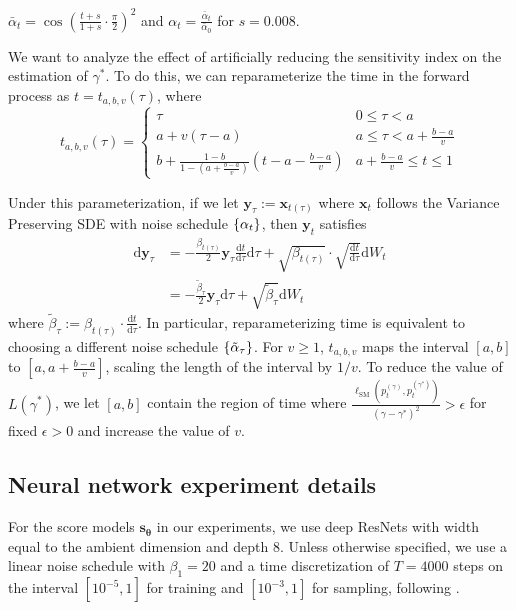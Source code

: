 \documentclass[11pt]{article}
\newcommand{\fitparenth}[1]{\left(#1\right)}
\newcommand{\fitbracket}[1]{\left[#1\right]}
\newcommand{\vect}[1]{\mathbf{#1}}
\theoremstyle{plain}
\newcommand{\1}{\mathbbm{1}}
\DeclarePairedDelimiter{\set}{\lbrace}{\rbrace}
\newcommand{\btheta}{{\boldsymbol{\theta}}}
\newcommand{\vx}{\vect{x}}
\newcommand{\vs}{\vect{s}}
\newcommand{\lsm}{\ell_\mathrm{SM}}
\newcommand{\pdist}[2][]{p_{#1}^{(#2)}}
\begin{document}
\begin{appendices}
$    \bar\alpha_t=\cos\fitparenth{\frac{t+s}{1+s}\cdot \frac{\pi}{2}}^2$ and $\alpha_t =\frac{\bar\alpha_t}{\bar\alpha_0}$
for $s=0.008$. 


We want to analyze the effect of artificially reducing the sensitivity index on the estimation of $\gamma^*$. To do this, we can reparameterize the time in the forward process as $t=t_{a,b,v}(\tau)$, where 
\[t_{a,b,v}(\tau)=\begin{cases}
    \tau & 0\leq \tau<a
    \\
    a + v(\tau-a)& a \leq \tau <a + \frac{b-a}{v}
    \\
    b + \frac{1-b}{1-\fitparenth{a + \frac{b-a}{v}}}\fitparenth{t - a - \frac{b-a}{v}} & a + \frac{b-a}{v} \leq t\leq 1
\end{cases}\]

Under this parameterization, if we let $\vect y_\tau:= \vx_{t(\tau)}$ where $\vx_t$ follows the Variance Preserving SDE with noise schedule $\set{\alpha_t}$, then $\vect y_t$ satisfies
\begin{align}
    \mathrm{d}\vect y_\tau &= -\frac{\beta_{t(\tau)}}{2}\vect y_\tau \frac{\mathrm{d}t}{\mathrm{d} \tau}\mathrm{d}\tau + \sqrt{\beta_{t(\tau)}}\cdot \sqrt{\frac{\mathrm{d}t}{\mathrm{d}\tau}}\mathrm dW_t
    \\
    &= -\frac{\tilde{\beta}_{\tau}}{2}\vect y_\tau \mathrm{d}\tau + \sqrt{\tilde{\beta}_{\tau}}\mathrm{d}W_t
\end{align}
where $\tilde{\beta}_\tau:= \beta_{t(\tau)} \cdot \frac{\mathrm{d}t}{\mathrm{d}\tau}$. In particular, reparameterizing time is equivalent to choosing a different noise schedule $\set{\tilde{\alpha}_\tau}$. For $v\geq 1$, $t_{a,b,v}$ maps the interval $[a,b]$ to $\fitbracket{a, a+\frac{b-a}{v}}$, scaling the length of the interval by $1/v$. To reduce the value of $L(\gamma^*)$, we let $[a,b]$ contain the region of time where $\frac{\lsm(\pdist[t]{\gamma}, \pdist[t]{\gamma^*})}{(\gamma-\gamma^*)^2}>\epsilon$ for fixed $\epsilon>0$ and increase the value of $v$.

\subsection{Neural network experiment details}

For the score models $\vs_\btheta$ in our experiments, we use deep ResNets \citep{He2015DeepRL} with width equal to the ambient dimension and depth $8$. Unless otherwise specified, we use a linear noise schedule with $\beta_1=20$ and a time discretization of $T=4000$ steps on the interval $[10^{-5},1]$ for training and $[10^{-3},1]$ for sampling, following \citep{song2021scorebasedgenerativemodelingstochastic}.


\end{appendices}
\end{document}
